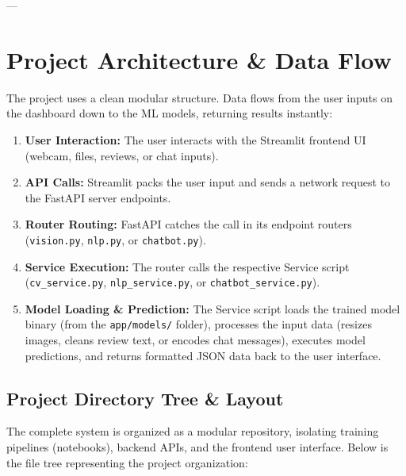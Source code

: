\documentclass[12pt,a4paper]{article}
\begin{document}
---

\newpage

\section{Project Architecture \& Data Flow}
The project uses a clean modular structure. Data flows from the user inputs on the dashboard down to the ML models, returning results instantly:

\begin{enumerate}
    \item \textbf{User Interaction:} The user interacts with the Streamlit frontend UI (webcam, files, reviews, or chat inputs).
    \item \textbf{API Calls:} Streamlit packs the user input and sends a network request to the FastAPI server endpoints.
    \item \textbf{Router Routing:} FastAPI catches the call in its endpoint routers (\texttt{vision.py}, \texttt{nlp.py}, or \texttt{chatbot.py}).
    \item \textbf{Service Execution:} The router calls the respective Service script (\texttt{cv\_service.py}, \texttt{nlp\_service.py}, or \texttt{chatbot\_service.py}).
    \item \textbf{Model Loading \& Prediction:} The Service script loads the trained model binary (from the \texttt{app/models/} folder), processes the input data (resizes images, cleans review text, or encodes chat messages), executes model predictions, and returns formatted JSON data back to the user interface.
\end{enumerate}

\subsection{Project Directory Tree \& Layout}
The complete system is organized as a modular repository, isolating training pipelines (notebooks), backend APIs, and the frontend user interface. Below is the file tree representing the project organization:
\end{document}
